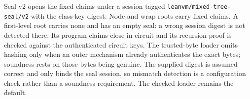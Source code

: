 Seal v2 opens the fixed claims under a session tagged \texttt{leanvm/mixed-tree-seal/v2} with the class-key digest. Node and wrap roots carry fixed claims. A first-level root carries none and has an empty seal: a wrong session digest is not detected there. Its program claims close in-circuit and its recursion proof is checked against the authenticated circuit keys. The trusted-byte loader omits hashing only when an outer mechanism already authenticates the exact bytes; soundness rests on those bytes being genuine. The supplied digest is assumed correct and only binds the seal session, so mismatch detection is a configuration check rather than a soundness requirement. The checked loader remains the default.
